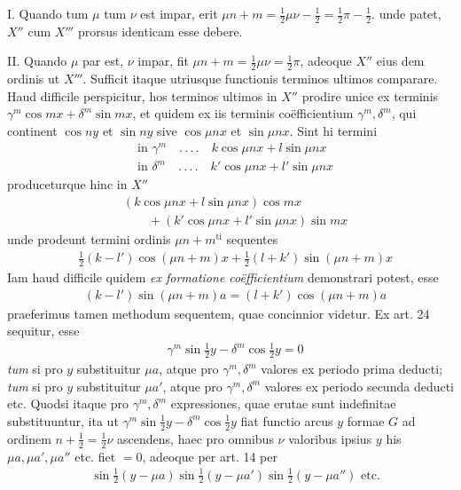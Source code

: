 I. Quando tum $\mu$ tum $\nu$ est impar, erit $\mu n+m=\tfrac12\mu\nu-\tfrac12=\tfrac12\pi-\tfrac12$. unde patet, $X''$ cum $X'''$ prorsus identicam esse debere.

II. Quando $\mu$ par est, $\nu$ impar, fit $\mu n+m=\tfrac12\mu\nu=\tfrac12\pi$, adeoque $X''$ eius%
dem ordinis ut $X'''$. Sufficit itaque utriusque functionis terminos ultimos comparare. Haud difficile perspicitur, hos terminos ultimos in $X''$ prodire unice ex terminis $\gamma^m\cos mx+\delta^m\sin mx$, et quidem ex iis terminis coëfficientium $\gamma^m,\delta^m$, qui continent $\cos ny$ et $\sin ny$ sive $\cos\mu nx$ et $\sin\mu nx$. Sint hi termini
\[
\begin{aligned}
&\text{in }\gamma^m\quad.\,.\,.\,.\quad k\cos\mu nx+l\sin\mu nx\\[5pt]
&\text{in }\delta^m\quad.\,.\,.\,.\quad k'\cos\mu nx+l'\sin\mu nx
\end{aligned}
\]
produceturque hinc in $X''$
\[
\begin{aligned}
&(k\cos\mu nx+l\sin\mu nx)\cos mx\\[5pt]
&\qquad{}+(k'\cos\mu nx+l'\sin\mu nx)\sin mx
\end{aligned}
\]
unde prodeunt termini ordinis $\mu n+m^{\mathrm{ti}}$ sequentes
\[
\begin{aligned}
&\tfrac12(k-l')\cos(\mu n+m)x+\tfrac12(l+k')\sin(\mu n+m)x
\end{aligned}
\]
Iam haud difficile quidem \textit{ex formatione coëfficientium} demonstrari potest, esse
\[
\begin{aligned}
&(k-l')\sin(\mu n+m)a=(l+k')\cos(\mu n+m)a
\end{aligned}
\]
praeferimus tamen methodum sequentem, quae concinnior videtur. Ex art. 24 sequitur, esse
\[
\begin{aligned}
&\gamma^m\sin\tfrac12y-\delta^m\cos\tfrac12y=0
\end{aligned}
\]
\textit{tum} si pro $y$ substituitur $\mu a$, atque pro $\gamma^m,\delta^m$ valores ex periodo prima deducti;
\textit{tum} si pro $y$ substituitur $\mu a'$, atque pro $\gamma^m,\delta^m$ valores ex periodo secunda deducti etc. Quodsi itaque pro $\gamma^m,\delta^m$ expressiones, quae erutae sunt indefinitae substituuntur, ita ut $\gamma^m\sin\tfrac12y-\delta^m\cos\tfrac12y$ fiat functio arcus $y$ formae $G$ ad ordinem $n+\tfrac12=\tfrac12\nu$ ascendens, haec pro omnibus $\nu$ valoribus ipsius $y$ his $\mu a,\mu a',\mu a''$ etc. fiet $=0$, adeoque per art. 14 per
\[
\begin{aligned}
&\sin\tfrac12(y-\mu a)\sin\tfrac12(y-\mu a')\sin\tfrac12(y-\mu a'')\text{ etc.}
\end{aligned}
\]
